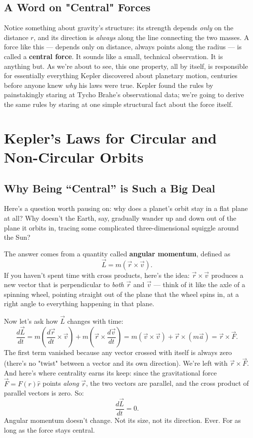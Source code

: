 \documentclass[11pt]{article}
\begin{document}
\subsection*{A Word on "Central" Forces}

Notice something about gravity's structure: its strength depends \emph{only} on the distance $r$,
and its direction is \emph{always} along the line connecting the two masses. A force like this ---
depends only on distance, always points along the radius --- is called a \textbf{central force}.
It sounds like a small, technical observation. It is anything but. As we're about to see, this one
property, all by itself, is responsible for essentially everything Kepler discovered about
planetary motion, centuries before anyone knew \emph{why} his laws were true. Kepler found the
rules by painstakingly staring at Tycho Brahe's observational data; we're going to derive the same
rules by staring at one simple structural fact about the force itself.

\section{Kepler's Laws for Circular and Non-Circular Orbits}

\subsection{Why Being ``Central'' is Such a Big Deal}

Here's a question worth pausing on: why does a planet's orbit stay in a flat plane at all? Why
doesn't the Earth, say, gradually wander up and down out of the plane it orbits in, tracing some
complicated three-dimensional squiggle around the Sun?

The answer comes from a quantity called \textbf{angular momentum}, defined as
\[
\vec L = m(\vec r\times\vec v).
\]
If you haven't spent time with cross products, here's the idea: $\vec r\times\vec v$ produces a new
vector that is perpendicular to \emph{both} $\vec r$ and $\vec v$ --- think of it like the axle of a
spinning wheel, pointing straight out of the plane that the wheel spins in, at a right angle to
everything happening in that plane.

Now let's ask how $\vec L$ changes with time:
\[
\frac{d\vec L}{dt} = m\left(\frac{d\vec r}{dt}\times\vec v\right) + m\left(\vec r\times\frac{d\vec v}{dt}\right)
= m(\vec v\times\vec v) + \vec r\times(m\vec a) = \vec r\times\vec F.
\]
The first term vanished because any vector crossed with itself is always zero (there's no "twist"
between a vector and its own direction). We're left with $\vec r\times\vec F$. And here's where
centrality earns its keep: since the gravitational force $\vec F=F(r)\hat r$ points \emph{along}
$\vec r$, the two vectors are parallel, and the cross product of parallel vectors is zero. So:
\[
\boxed{\frac{d\vec L}{dt} = 0.}
\]
Angular momentum doesn't change. Not its size, not its direction. Ever. For as long as the force
stays central.
\end{document}
